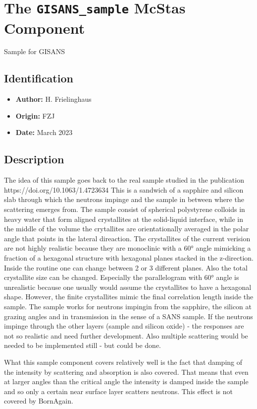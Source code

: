 \section{The \texttt{GISANS\_sample} McStas Component}
Sample for GISANS

\subsection*{Identification}
\begin{itemize}
  \item \textbf{Author:} H. Frielinghaus
  \item \textbf{Origin:} FZJ
  \item \textbf{Date:} March 2023
\end{itemize}

\subsection*{Description}
The idea of this sample goes back to the real sample studied in the publication https://doi.org/10.1063/1.4723634 This is a sandwich of a sapphire and silicon slab through which the neutrons impinge and the sample in between where the scattering emerges from. The sample consist of spherical polystyrene colloids in heavy water that form aligned crystallites at the solid-liquid interface, while in the middle of the volume the crytallites are orientationally averaged in the polar angle that points in the lateral direaction. The crystallites of the current verision are not highly realistic because they are monoclinic with a 60° angle mimicking a fraction of a hexagonal structure with hexagonal planes stacked in the z-direction. Inside the routine one can change between 2 or 3 different planes. Also the total crystallite size can be changed. Especially the parallelogram with 60° angle is unrealistic because one usually would assume the crystallites to have a hexagonal shape. However, the finite crystallites mimic the final correlation length inside the sample. The sample works for neutrons impingin from the sapphire, the silicon at grazing angles and in transmission in the sense of a SANS sample. If the neutrons impinge through the other layers (sample and silicon oxide) - the responses are not so realistic and need further development. Also multiple scattering would be needed to be implemented still - but could be done.

What this sample component covers relatively well is the fact that damping of the intensity by scattering and absorption is also covered. That means that even at larger angles than the critical angle the intensity is damped inside the sample and so only a certain near surface layer scatters neutrons. This effect is not covered by BornAgain.

